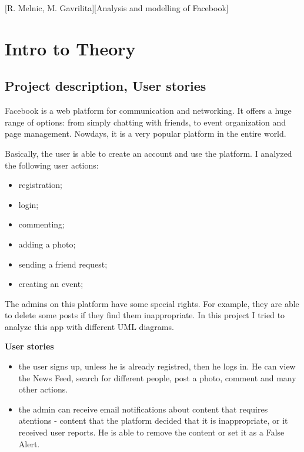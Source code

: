\documentclass{article}
\begin{document}
	[R. Melnic, M. Gavrilita][Analysis and modelling of Facebook]

	\tableofcontents
	\newpage

	\pagestyle{fancy}
	\fancyhf{}

	\chead{}
	\fancyhead[L]{\leftmark}

	\section{Intro to Theory}
		\subsection{Project description, User stories}
			Facebook is a web platform for communication and networking. It offers a huge range of options: from simply chatting with friends, to event organization and page management. Nowdays, it is a very popular platform in the entire world.

			Basically, the user is able to create an account and use the platform. I analyzed the following user actions:
			\begin{itemize}
				\item registration;
				\item login;
				\item commenting;
				\item adding a photo;
				\item sending a friend request;
				\item creating an event;
			\end{itemize}
			The admins on this platform have some special rights. For example, they are able to delete some posts if they find them inappropriate.
			In this project I tried to analyze this app with different UML diagrams.

			\textbf{User stories}
			\begin{itemize}
				\item the user signs up, unless he is already registred, then he logs in. He can view the News Feed, search for different people, post a photo, comment and many other actions.

				\item the admin can receive email notifications about content that requires atentions - content that the platform decided that it is inappropriate, or it received user reports. He is able to remove the content or set it as a False Alert.
			\end{itemize}
\end{document}
